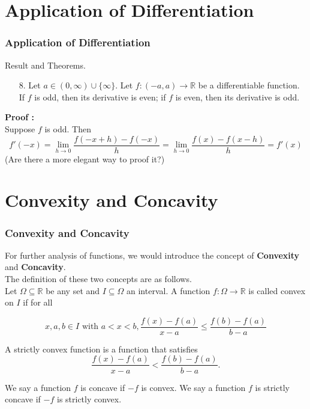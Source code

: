 \documentclass[12pt, t]{beamer}
\begin{document}
\section{Application of Differentiation}
\begin{frame}
    \frametitle{Application of Differentiation}
Result and Theorems.\\
\begin{enumerate}
    \item[8.] Let $a\in(0,\infty)\cup\{\infty\}$. Let $f:(-a,a)\rightarrow\mathbb{R}$ be a differentiable function. 
        If $f$ is odd, then its derivative is even; if $f$ is even, then its derivative is odd. 
\end{enumerate}

\textbf{Proof :}\\
\hspace{1em} Suppose $f$ is odd. Then
\begin{equation*}
    f'(-x)=\underset{h\rightarrow 0}{\lim}\frac{f(-x+h)-f(-x)}{h}=\underset{h\rightarrow 0}{\lim}\frac{f(x)-f(x-h)}{h}=f'(x)
\end{equation*} 
(Are there a more elegant way to proof it?)
\end{frame}


\section{Convexity and Concavity}
\begin{frame}
    \frametitle{Convexity and Concavity}

For further analysis of functions, we would introduce the concept of \textbf{Convexity} and \textbf{Concavity}. \\
The definition of these two concepts are as follows.\\

\hspace{1em}
Let $\Omega\subseteq\mathbb{R}$ be any set and $I\subseteq\Omega$ an interval. A function $f:\Omega\rightarrow\mathbb{R}$ 
is called convex on $I$ if for all 

\begin{equation*}
    x, a, b\in I \text{ with } a<x<b, \frac{f(x)-f(a)}{x-a}\leq\frac{f(b)-f(a)}{b-a}
\end{equation*}

\vspace{0.5em}
\hspace{1em}
A strictly convex function is a function that satisfies 
\begin{equation}
    \frac{f(x)-f(a)}{x-a}<\frac{f(b)-f(a)}{b-a}.
\end{equation}

\hspace{1em}
We say a function $f$ is concave if $-f$ is convex. We say a function $f$ is strictly concave if $-f$ is strictly convex.
\end{frame}
\end{document}
